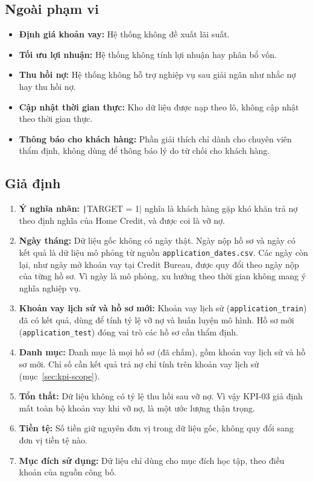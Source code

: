 \subsection*{Ngoài phạm vi}
\label{sec:out-of-scope}
\begin{itemize}[topsep=0pt, itemsep=1pt]
	\item \textbf{Định giá khoản vay:} Hệ thống không đề xuất lãi suất.
	\item \textbf{Tối ưu lợi nhuận:} Hệ thống không tính lợi nhuận hay phân bổ vốn.
	\item \textbf{Thu hồi nợ:} Hệ thống không hỗ trợ nghiệp vụ sau giải ngân như nhắc nợ hay thu hồi nợ.
	\item \textbf{Cập nhật thời gian thực:} Kho dữ liệu được nạp theo lô, không cập nhật theo thời gian thực.
	\item \textbf{Thông báo cho khách hàng:} Phần giải thích chỉ dành cho chuyên viên thẩm định, không dùng để thông báo lý do từ chối cho khách hàng.
\end{itemize}

\subsection*{Giả định}
\label{sec:assumptions}
\begin{enumerate}[label=\textit{\arabic*},topsep=0pt, itemsep=1pt]
	\item \textbf{Ý nghĩa nhãn:} \texttt|TARGET = 1| nghĩa là khách hàng gặp khó khăn trả nợ theo định nghĩa của Home Credit, và được coi là vỡ nợ.~\cite{homecredit2018}
	\item \textbf{Ngày tháng:} Dữ liệu gốc không có ngày thật. Ngày nộp hồ sơ và ngày có kết quả là dữ liệu mô phỏng từ nguồn \texttt{application\_dates.csv}. Các ngày còn lại, như ngày mở khoản vay tại Credit Bureau, được quy đổi theo ngày nộp của từng hồ sơ. Vì ngày là mô phỏng, xu hướng theo thời gian không mang ý nghĩa nghiệp vụ.
	\item \textbf{Khoản vay lịch sử và hồ sơ mới:} Khoản vay lịch sử (\texttt{application\_train}) đã có kết quả, dùng để tính tỷ lệ vỡ nợ và huấn luyện mô hình. Hồ sơ mới (\texttt{application\_test}) đóng vai trò các hồ sơ cần thẩm định.
	\item \textbf{Danh mục:} Danh mục là mọi hồ sơ (đã chấm), gồm khoản vay lịch sử và hồ sơ mới. Chỉ số cần kết quả trả nợ chỉ tính trên khoản vay lịch sử (mục~\ref{sec:kpi-scope}).
	\item \textbf{Tổn thất:} Dữ liệu không có tỷ lệ thu hồi sau vỡ nợ. Vì vậy KPI-03 giả định mất toàn bộ khoản vay khi vỡ nợ, là một ước lượng thận trọng.
	\item \textbf{Tiền tệ:} Số tiền giữ nguyên đơn vị trong dữ liệu gốc, không quy đổi sang đơn vị tiền tệ nào.
	\item \textbf{Mục đích sử dụng:} Dữ liệu chỉ dùng cho mục đích học tập, theo điều khoản của nguồn công bố.
\end{enumerate}
